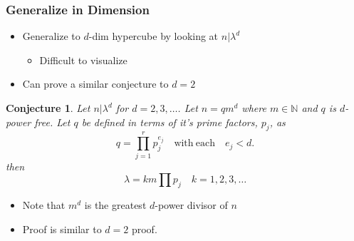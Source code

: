 \documentclass{beamer}
\theoremstyle{mydef}
\newtheorem{conj}{Conjecture}[section]
\begin{document}
\frame
{
 \frametitle{Generalize in Dimension}
  \begin{itemize}
  \item Generalize to $d$-dim hypercube by looking at $n \vert \lambda^d$
  \begin{itemize}
  \item Difficult to visualize
      \end{itemize}

  \item Can prove a similar conjecture to $d=2$
   \end{itemize}
  \begin{conj}
Let $n\vert \lambda^d$ for $d=2, 3, \ldots$. Let $n = qm^d$ where $m \in \mathbb{N}$ and $q$ is $d$-power 
free. Let $q$ be defined in terms of it's prime factors, $p_j$, as
\[
	q = \prod\limits_{j=1}^{r} p_j^{e_j}\quad \text{with}\ \text{each}\quad e_j < d.
\]
then
\[
	\lambda = k m \prod p_j \quad k = 1, 2, 3, \ldots
\]
\end{conj}
\begin{itemize}
\item Note that $m^d$ is the greatest $d$-power divisor of $n$
\item Proof is similar to $d=2$ proof.
\end{itemize}
}
\end{document}
